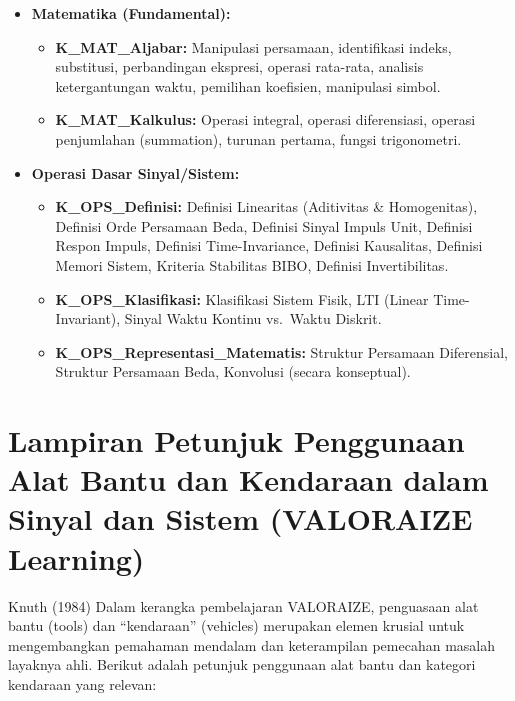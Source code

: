 \documentclass[
  letterpaper,
  DIV=11,
  numbers=noendperiod]{scrreprt}
\providecommand{\tightlist}{%
  \setlength{\itemsep}{0pt}\setlength{\parskip}{0pt}}
\begin{document}
\begin{itemize}
\tightlist
\item
  \textbf{Matematika (Fundamental):}

  \begin{itemize}
  \tightlist
  \item
    \textbf{K\_MAT\_Aljabar:} Manipulasi persamaan, identifikasi indeks,
    substitusi, perbandingan ekspresi, operasi rata-rata, analisis
    ketergantungan waktu, pemilihan koefisien, manipulasi simbol.
  \item
    \textbf{K\_MAT\_Kalkulus:} Operasi integral, operasi diferensiasi,
    operasi penjumlahan (summation), turunan pertama, fungsi
    trigonometri.
  \end{itemize}
\item
  \textbf{Operasi Dasar Sinyal/Sistem:}

  \begin{itemize}
  \tightlist
  \item
    \textbf{K\_OPS\_Definisi:} Definisi Linearitas (Aditivitas \&
    Homogenitas), Definisi Orde Persamaan Beda, Definisi Sinyal Impuls
    Unit, Definisi Respon Impuls, Definisi Time-Invariance, Definisi
    Kausalitas, Definisi Memori Sistem, Kriteria Stabilitas BIBO,
    Definisi Invertibilitas.
  \item
    \textbf{K\_OPS\_Klasifikasi:} Klasifikasi Sistem Fisik, LTI (Linear
    Time-Invariant), Sinyal Waktu Kontinu vs.~Waktu Diskrit.
  \item
    \textbf{K\_OPS\_Representasi\_Matematis:} Struktur Persamaan
    Diferensial, Struktur Persamaan Beda, Konvolusi (secara konseptual).
  \end{itemize}
\end{itemize}


\chapter{Lampiran Petunjuk Penggunaan Alat Bantu dan Kendaraan dalam
Sinyal dan Sistem (VALORAIZE
Learning)}\label{lampiran-petunjuk-penggunaan-alat-bantu-dan-kendaraan-dalam-sinyal-dan-sistem-valoraize-learning}

Knuth (1984) Dalam kerangka pembelajaran VALORAIZE, penguasaan alat
bantu (tools) dan ``kendaraan'' (vehicles) merupakan elemen krusial
untuk mengembangkan pemahaman mendalam dan keterampilan pemecahan
masalah layaknya ahli. Berikut adalah petunjuk penggunaan alat bantu dan
kategori kendaraan yang relevan:
\end{document}
